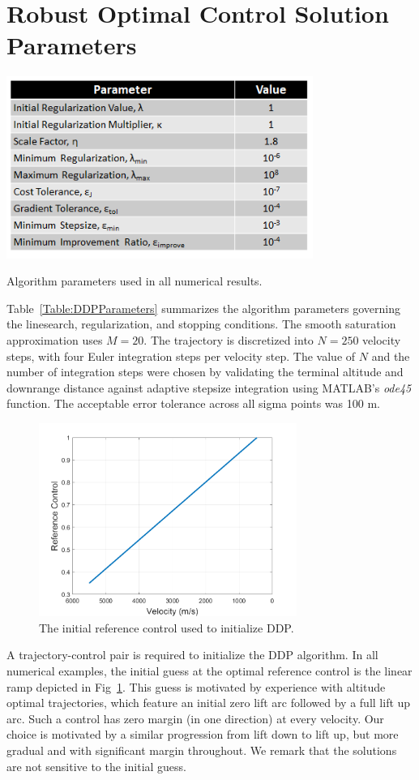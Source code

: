\section{Robust Optimal Control Solution Parameters}
\begin{table}[h!]
	\centering
	\includegraphics[width=0.75\textwidth]{Images/DDP_Parameters}
	\caption{Algorithm parameters used in all numerical results.}
	\label{Table:DDPParameters}
\end{table}
Table~\ref{Table:DDPParameters} summarizes the algorithm parameters governing the linesearch, regularization, and stopping conditions. 
The smooth saturation approximation uses $M = 20$. The trajectory is discretized into $ N=250 $ velocity steps, with four Euler integration steps per velocity step. The value of $ N $ and the number of integration steps were chosen by validating the terminal altitude and downrange distance against adaptive stepsize integration using MATLAB's \textit{ode45} function. The acceptable error tolerance across all sigma points was 100 m.

\begin{figure}[h!]
	\centering
	\includegraphics[width=0.75\textwidth]{Images/GuessControl}
	\caption{The initial reference control used to initialize DDP.}
	\label{Fig:GuessControl}
\end{figure}
A trajectory-control pair is required to initialize the DDP algorithm. In all numerical examples, the initial guess at the optimal reference control is the linear ramp depicted in Fig~\ref{Fig:GuessControl}. This guess is motivated by experience with altitude optimal trajectories, which feature an initial zero lift arc followed by a full lift up arc. Such a control has zero margin (in one direction) at every velocity. Our choice is motivated by a similar progression from lift down to lift up, but more gradual and with significant margin throughout. We remark that the solutions are not sensitive to the initial guess. 

